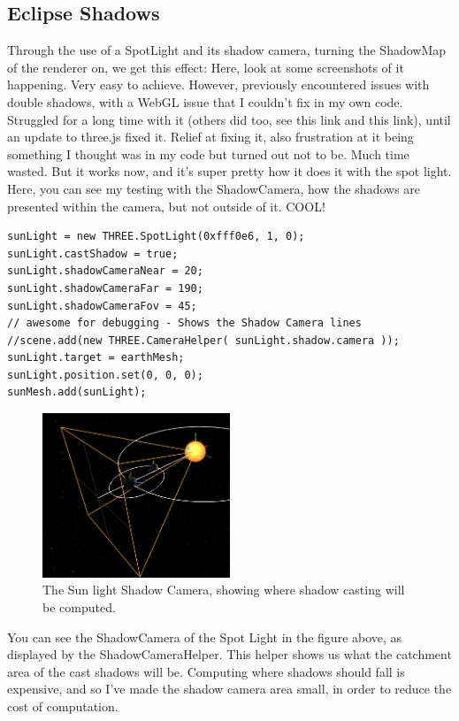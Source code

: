 \documentclass[12pt]{article}
\begin{document}
\subsection{Eclipse Shadows}
Through the use of a SpotLight and its shadow camera, turning the ShadowMap of the renderer on, we get this effect: Here, look at some screenshots of it happening. Very easy to achieve. However, previously encountered issues with double shadows, with a WebGL issue that I couldn't fix in my own code. Struggled for a long time with it (others did too, see this link and this link), until an update to three.js fixed it. Relief at fixing it, also frustration at it being something I thought was in my code but turned out not to be. Much time wasted. But it works now, and it's super pretty how it does it with the spot light. Here, you can see my testing with the ShadowCamera, how the shadows are presented within the camera, but not outside of it. COOL!
\begin{lstlisting}
sunLight = new THREE.SpotLight(0xfff0e6, 1, 0);
sunLight.castShadow = true;
sunLight.shadowCameraNear = 20;
sunLight.shadowCameraFar = 190;
sunLight.shadowCameraFov = 45;
// awesome for debugging - Shows the Shadow Camera lines
//scene.add(new THREE.CameraHelper( sunLight.shadow.camera ));
sunLight.target = earthMesh;    
sunLight.position.set(0, 0, 0);
sunMesh.add(sunLight);
\end{lstlisting}

\begin{figure}[H]
        \centering
       
                \includegraphics[width=0.5\textwidth]{images/shadowcamera}
                \caption{The Sun light Shadow Camera, showing where shadow casting will be computed.}
                \label{fig: The Shadow Camera.}
      
\end{figure}

You can see the ShadowCamera of the Spot Light in the figure above, as displayed by the ShadowCameraHelper. This helper shows us what the catchment area of the cast shadows will be. Computing where shadows should fall is expensive, and so I've made the shadow camera area small, in order to reduce the cost of computation.
\end{document}
